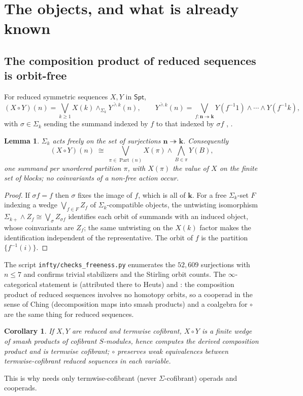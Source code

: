 \documentclass[11pt]{amsart}
\newtheorem{lemma}[subsection]{Lemma}
\newtheorem{corollary}[subsection]{Corollary}
\theoremstyle{definition}
\theoremstyle{remark}
\newcommand{\Spt}{\mathsf{Spt}}
\newcommand{\Part}{\operatorname{Part}}
\begin{document}
\section{The objects, and what is already known}\label{sec:objects}

\subsection{The composition product of reduced sequences is orbit-free}
For reduced symmetric sequences $X,Y$ in $\Spt$,
\[ (X\circ Y)(n)=\bigvee_{k\geq1} X(k)\wedge_{\Sigma_k} Y^{\check\wedge k}(n),\qquad Y^{\check\wedge k}(n)=\bigvee_{f\colon \mathbf n\twoheadrightarrow\mathbf k} Y(f^{-1}1)\wedge\cdots\wedge Y(f^{-1}k), \]
with $\sigma\in\Sigma_k$ sending the summand indexed by $f$ to that indexed by $\sigma f$ \cite[(3.2)]{Cl2}, \cite[\S 2.2]{Cl1}.

\begin{lemma}\label{lem:free}
$\Sigma_k$ acts freely on the set of surjections $\mathbf n\twoheadrightarrow\mathbf k$. Consequently
\[ (X\circ Y)(n)\;\cong\;\bigvee_{\pi\in\Part(n)} X(\pi)\wedge\bigwedge_{B\in\pi} Y(B), \]
one summand per unordered partition $\pi$, with $X(\pi)$ the value of $X$ on the finite set of blocks; no coinvariants of a non-free action occur.
\end{lemma}
\begin{proof}
If $\sigma f=f$ then $\sigma$ fixes the image of $f$, which is all of $\mathbf k$. For a free $\Sigma_k$-set $F$ indexing a wedge $\bigvee_{f\in F}Z_f$ of $\Sigma_k$-compatible objects, the untwisting isomorphism $\Sigma_{k+}\wedge Z_f\cong\bigvee_\sigma Z_{\sigma f}$ identifies each orbit of summands with an induced object, whose coinvariants are $Z_f$; the same untwisting on the $X(k)$ factor makes the identification independent of the representative. The orbit of $f$ is the partition $\{f^{-1}(i)\}$.
\end{proof}
The script \texttt{infty/checks\_freeness.py} enumerates the $52{,}609$ surjections with $n\leq7$ and confirms trivial stabilizers and the Stirling orbit counts. The $\infty$-categorical statement is \cite[Remark 4.3.3]{Hau} (attributed there to Heuts) and \cite[(1)]{BB}: the composition product of reduced sequences involves no homotopy orbits, so a cooperad in the sense of Ching \cite[Definition 1.8]{Ch12} (decomposition maps into smash products) and a coalgebra for $\circ$ \cite[Definition 2.2]{BH} are the same thing for reduced sequences.

\begin{corollary}\label{cor:derived}
If $X,Y$ are reduced and termwise cofibrant, $X\circ Y$ is a finite wedge of smash products of cofibrant $S$-modules, hence computes the derived composition product and is termwise cofibrant; $\circ$ preserves weak equivalences between termwise-cofibrant reduced sequences in each variable.
\end{corollary}
This is why \cite{Ch12} needs only termwise-cofibrant (never $\Sigma$-cofibrant) operads and cooperads.
\end{document}
